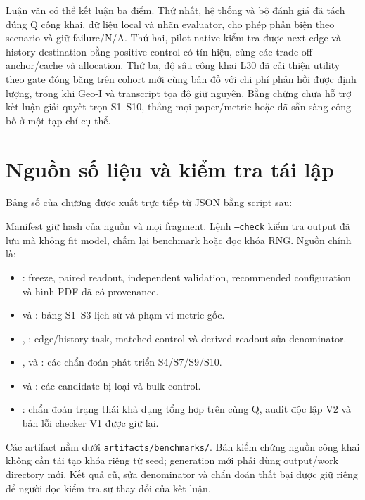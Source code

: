 Luận văn có thể kết luận ba điểm. Thứ nhất, hệ thống và bộ đánh giá đã tách
đúng Q công khai, dữ liệu local và nhãn evaluator, cho phép phản biện theo
scenario và giữ failure/N/A. Thứ hai, pilot native kiểm tra được next-edge và
history-destination bằng positive control có tín hiệu, cùng các trade-off
anchor/cache và allocation. Thứ ba, độ sâu công khai L30 đã cải thiện utility
theo gate đóng băng trên cohort mới cùng bản đồ với chi phí phản hồi được
định lượng, trong khi Geo-I và transcript tọa độ giữ nguyên. Bằng chứng chưa
hỗ trợ kết luận giải quyết trọn S1--S10, thắng mọi paper/metric hoặc đã sẵn
sàng công bố ở một tạp chí cụ thể.

\section{Nguồn số liệu và kiểm tra tái lập}
\label{sec:current-evaluation-provenance}

Bảng số của chương được xuất trực tiếp từ JSON bằng script sau:
\begin{quote}\small
{}
\end{quote}
Manifest  giữ hash của
nguồn và mọi fragment. Lệnh \texttt{--check} kiểm tra output đã lưu mà không
fit model, chấm lại benchmark hoặc đọc khóa RNG. Nguồn chính là:
\begin{itemize}
  \item {}:
  freeze, paired readout, independent validation, recommended configuration
  và hình PDF đã có provenance.
  \item {} và :
  bảng S1--S3 lịch sử và phạm vi metric gốc.
  \item {},
  :
  edge/history task, matched control và derived readout sửa denominator.
  \item {},
   và
  :
  các chẩn đoán phát triển S4/S7/S9/S10.
  \item {} và
  :
  các candidate bị loại và bulk control.
  \item {}:
  chẩn đoán trạng thái khả dụng tổng hợp trên cùng Q, audit độc lập V2 và
  bản lỗi checker V1 được giữ lại.
\end{itemize}
Các artifact nằm dưới \texttt{artifacts/benchmarks/}. Bản kiểm chứng nguồn
công khai không cần tái tạo khóa riêng từ seed; generation mới phải dùng
output/work directory mới. Kết quả cũ, sửa denominator và chẩn đoán thất bại
được giữ riêng để người đọc kiểm tra sự thay đổi của kết luận.
